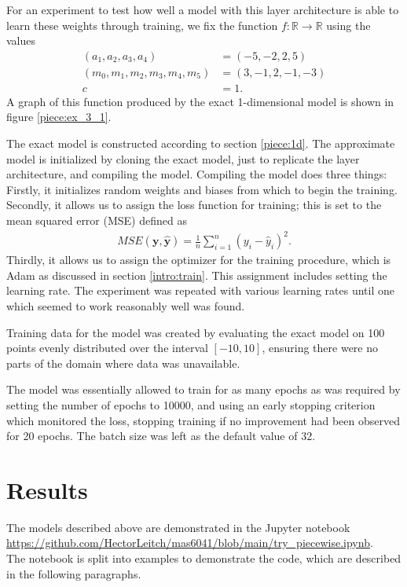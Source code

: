 \documentclass{somasmsc}
\begin{document}
For an experiment to test how well a model with this layer architecture is able to learn these weights through training, we fix the function $f : \mathbb{R} \rightarrow \mathbb{R}$ using the values
\begin{align*}
    \left(a_1, a_2, a_3, a_4\right) &= \left(-5, -2, 2, 5\right) \\
    \left(m_0, m_1, m_2, m_3, m_4, m_5\right) &= \left(3, -1, 2, -1, -3\right) \\
    c &= 1.
\end{align*}
 A graph of this function produced by the exact 1-dimensional model is shown in figure \ref{piece:ex_3_1}.

 The exact model is constructed according to section \ref{piece:1d}. The approximate model is initialized by cloning the exact model, just to replicate the layer architecture, and compiling the model. Compiling the model does three things: Firstly, it initializes random weights and biases from which to begin the training. Secondly, it allows us to assign the loss function for training; this is set to the mean squared error (MSE) defined as
 \begin{align*}
     MSE\left(\pmb{y}, \hat{\pmb{y}}\right) = \frac{1}{n}\sum_{i=1}^n \left(y_i - \hat{y}_i\right)^2.
 \end{align*}
 Thirdly, it allows us to assign the optimizer for the training procedure, which is Adam as discussed in section \ref{intro:train}. This assignment includes setting the learning rate. The experiment was repeated with various learning rates until one which seemed to work reasonably well was found.

 Training data for the model was created by evaluating the exact model on 100 points evenly distributed over the interval $\left[-10, 10\right]$, ensuring there were no parts of the domain where data was unavailable.

 The model was essentially allowed to train for as many epochs as was required by setting the number of epochs to 10000, and using an early stopping criterion which monitored the loss, stopping training if no improvement had been observed for 20 epochs. The batch size was left as the default value of 32.

\section{Results}

The models described above are demonstrated in the Jupyter notebook \url{https://github.com/HectorLeitch/mas6041/blob/main/try_piecewise.ipynb}. \\ The notebook is split into examples to demonstrate the code, which are described in the following paragraphs.
\end{document}
